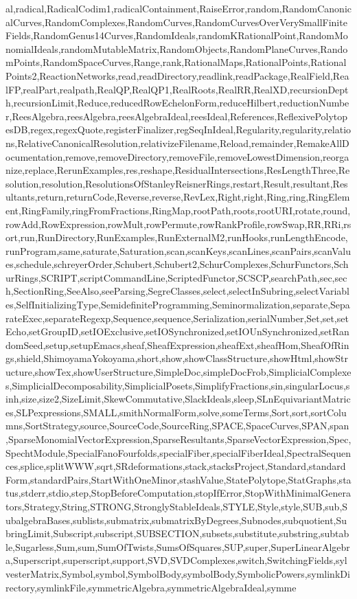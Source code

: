 {al,radical,RadicalCodim1,radicalContainment,RaiseError,random,RandomCanonicalCurves,RandomComplexes,RandomCurves,RandomCurvesOverVerySmallFiniteFields,RandomGenus14Curves,RandomIdeals,randomKRationalPoint,RandomMonomialIdeals,randomMutableMatrix,RandomObjects,RandomPlaneCurves,RandomPoints,RandomSpaceCurves,Range,rank,RationalMaps,RationalPoints,RationalPoints2,ReactionNetworks,read,readDirectory,readlink,readPackage,RealField,RealFP,realPart,realpath,RealQP,RealQP1,RealRoots,RealRR,RealXD,recursionDepth,recursionLimit,Reduce,reducedRowEchelonForm,reduceHilbert,reductionNumber,ReesAlgebra,reesAlgebra,reesAlgebraIdeal,reesIdeal,References,ReflexivePolytopesDB,regex,regexQuote,registerFinalizer,regSeqInIdeal,Regularity,regularity,relations,RelativeCanonicalResolution,relativizeFilename,Reload,remainder,RemakeAllDocumentation,remove,removeDirectory,removeFile,removeLowestDimension,reorganize,replace,RerunExamples,res,reshape,ResidualIntersections,ResLengthThree,Resolution,resolution,ResolutionsOfStanleyReisnerRings,restart,Result,resultant,Resultants,return,returnCode,Reverse,reverse,RevLex,Right,right,Ring,ring,RingElement,RingFamily,ringFromFractions,RingMap,rootPath,roots,rootURI,rotate,round,rowAdd,RowExpression,rowMult,rowPermute,rowRankProfile,rowSwap,RR,RRi,rsort,run,RunDirectory,RunExamples,RunExternalM2,runHooks,runLengthEncode,runProgram,same,saturate,Saturation,scan,scanKeys,scanLines,scanPairs,scanValues,schedule,schreyerOrder,Schubert,Schubert2,SchurComplexes,SchurFunctors,SchurRings,SCRIPT,scriptCommandLine,ScriptedFunctor,SCSCP,searchPath,sec,sech,SectionRing,SeeAlso,seeParsing,SegreClasses,select,selectInSubring,selectVariables,SelfInitializingType,SemidefiniteProgramming,Seminormalization,separate,SeparateExec,separateRegexp,Sequence,sequence,Serialization,serialNumber,Set,set,setEcho,setGroupID,setIOExclusive,setIOSynchronized,setIOUnSynchronized,setRandomSeed,setup,setupEmacs,sheaf,SheafExpression,sheafExt,sheafHom,SheafOfRings,shield,ShimoyamaYokoyama,short,show,showClassStructure,showHtml,showStructure,showTex,showUserStructure,SimpleDoc,simpleDocFrob,SimplicialComplexes,SimplicialDecomposability,SimplicialPosets,SimplifyFractions,sin,singularLocus,sinh,size,size2,SizeLimit,SkewCommutative,SlackIdeals,sleep,SLnEquivariantMatrices,SLPexpressions,SMALL,smithNormalForm,solve,someTerms,Sort,sort,sortColumns,SortStrategy,source,SourceCode,SourceRing,SPACE,SpaceCurves,SPAN,span,SparseMonomialVectorExpression,SparseResultants,SparseVectorExpression,Spec,SpechtModule,SpecialFanoFourfolds,specialFiber,specialFiberIdeal,SpectralSequences,splice,splitWWW,sqrt,SRdeformations,stack,stacksProject,Standard,standardForm,standardPairs,StartWithOneMinor,stashValue,StatePolytope,StatGraphs,status,stderr,stdio,step,StopBeforeComputation,stopIfError,StopWithMinimalGenerators,Strategy,String,STRONG,StronglyStableIdeals,STYLE,Style,style,SUB,sub,SubalgebraBases,sublists,submatrix,submatrixByDegrees,Subnodes,subquotient,SubringLimit,Subscript,subscript,SUBSECTION,subsets,substitute,substring,subtable,Sugarless,Sum,sum,SumOfTwists,SumsOfSquares,SUP,super,SuperLinearAlgebra,Superscript,superscript,support,SVD,SVDComplexes,switch,SwitchingFields,sylvesterMatrix,Symbol,symbol,SymbolBody,symbolBody,SymbolicPowers,symlinkDirectory,symlinkFile,symmetricAlgebra,symmetricAlgebraIdeal,symme}
